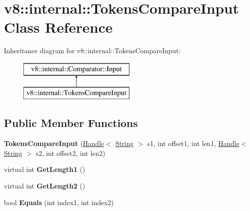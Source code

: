\hypertarget{classv8_1_1internal_1_1_tokens_compare_input}{}\section{v8\+:\+:internal\+:\+:Tokens\+Compare\+Input Class Reference}
\label{classv8_1_1internal_1_1_tokens_compare_input}
Inheritance diagram for v8\+:\+:internal\+:\+:Tokens\+Compare\+Input\+:\begin{figure}[H]
\begin{center}
\leavevmode
\includegraphics[height=2.000000cm]{classv8_1_1internal_1_1_tokens_compare_input}
\end{center}
\end{figure}
\subsection*{Public Member Functions}
\begin{DoxyCompactItemize}
\item 
{\bfseries Tokens\+Compare\+Input} (\hyperlink{classv8_1_1internal_1_1_handle}{Handle}$<$ \hyperlink{classv8_1_1internal_1_1_string}{String} $>$ s1, int offset1, int len1, \hyperlink{classv8_1_1internal_1_1_handle}{Handle}$<$ \hyperlink{classv8_1_1internal_1_1_string}{String} $>$ s2, int offset2, int len2)\hypertarget{classv8_1_1internal_1_1_tokens_compare_input_a4ff5ecf8d53b563347866122e2b9ec09}{}\label{classv8_1_1internal_1_1_tokens_compare_input_a4ff5ecf8d53b563347866122e2b9ec09}

\item 
virtual int {\bfseries Get\+Length1} ()\hypertarget{classv8_1_1internal_1_1_tokens_compare_input_aa0bcd3da38b02db2217a4326c52e9127}{}\label{classv8_1_1internal_1_1_tokens_compare_input_aa0bcd3da38b02db2217a4326c52e9127}

\item 
virtual int {\bfseries Get\+Length2} ()\hypertarget{classv8_1_1internal_1_1_tokens_compare_input_a6e7b76d46775f133ad411d493a5f3536}{}\label{classv8_1_1internal_1_1_tokens_compare_input_a6e7b76d46775f133ad411d493a5f3536}

\item 
bool {\bfseries Equals} (int index1, int index2)\hypertarget{classv8_1_1internal_1_1_tokens_compare_input_ac2fba90f89f1d179a99c7f172ddfbc52}{}\label{classv8_1_1internal_1_1_tokens_compare_input_ac2fba90f89f1d179a99c7f172ddfbc52}

\end{DoxyCompactItemize}
